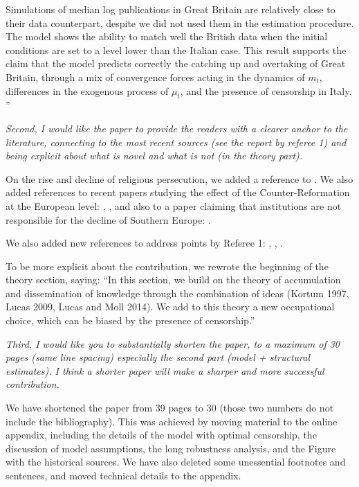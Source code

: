 \documentclass[12pt]{article}
\begin{document}
Simulations of median log publications in Great Britain are relatively close to their data counterpart, despite we did not used them in the estimation procedure. The model shows the ability to match well the British data when the initial conditions are set to a level lower than the Italian case. This result supports the claim that the model predicts correctly the catching up and overtaking of Great Britain, through a mix of convergence forces acting in the dynamics of $m_t$, differences in the  exogenous process of $\mu_t$, and the presence of censorship in Italy.
''




\textit{Second, I would like the paper to provide the readers with a clearer anchor
to the literature, connecting to the most recent sources (see the report by referee 1) and
being explicit about what is novel and what is not (in the theory part).}

On the rise and decline of religious persecution, we added a reference to .
We also added references to recent papers studying the effect of the Counter-Reformation at the European level: , ,
and also to a paper claiming that institutions are not responsible for the decline of Southern Europe: .

We also added new references to address points by Referee 1: , , .

To be more explicit about the contribution, we rewrote the beginning of the theory section, saying: ``In this section, we build on the theory of accumulation and dissemination of knowledge through the combination of ideas (Kortum 1997, Lucas 2009, Lucas and Moll 2014). We add to this theory a new occupational choice, which can be biased by the presence of censorship.''


\textit{Third, I would like
you to substantially shorten the paper, to a maximum of 30 pages (same line spacing)
especially the second part (model + structural estimates). I think a shorter paper will make
a sharper and more successful contribution.}

We have shortened the paper from 39 pages to 30 (those two numbers do not include the bibliography). This was achieved by moving material to the online appendix, including the details of the model with optimal censorship, the discussion of model assumptions, the long robustness analysis, and the Figure with the historical sources. We have also deleted some unessential footnotes and sentences, and moved technical details to the appendix.
\end{document}
